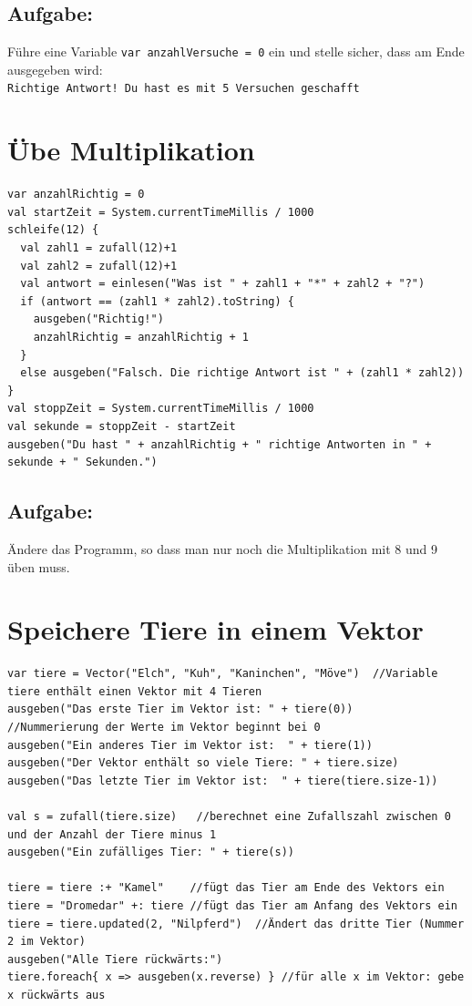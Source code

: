 \section*{\color{BrickRed}Aufgabe:}
Führe eine Variable \lstinline{var anzahlVersuche = 0} ein und stelle sicher, dass am Ende ausgegeben wird:\\
\lstinline{Richtige Antwort! Du hast es mit 5 Versuchen geschafft}
\chapter{Übe Multiplikation}
\begin{lstlisting}[basicstyle={\ttfamily\fontsize{16}{19}\selectfont},numbers=none]
var anzahlRichtig = 0
val startZeit = System.currentTimeMillis / 1000
schleife(12) {
  val zahl1 = zufall(12)+1
  val zahl2 = zufall(12)+1
  val antwort = einlesen("Was ist " + zahl1 + "*" + zahl2 + "?")
  if (antwort == (zahl1 * zahl2).toString) {
    ausgeben("Richtig!")
    anzahlRichtig = anzahlRichtig + 1
  }
  else ausgeben("Falsch. Die richtige Antwort ist " + (zahl1 * zahl2))
}
val stoppZeit = System.currentTimeMillis / 1000
val sekunde = stoppZeit - startZeit
ausgeben("Du hast " + anzahlRichtig + " richtige Antworten in " + sekunde + " Sekunden.")
\end{lstlisting}
        
\section*{\color{BrickRed}Aufgabe:}
Ändere das Programm, so dass man nur noch die Multiplikation mit 8 und 9 üben muss.
\chapter{Speichere Tiere in einem Vektor}
\begin{lstlisting}[basicstyle={\ttfamily\fontsize{14}{17}\selectfont},numbers=none]
var tiere = Vector("Elch", "Kuh", "Kaninchen", "Möve")  //Variable tiere enthält einen Vektor mit 4 Tieren
ausgeben("Das erste Tier im Vektor ist: " + tiere(0))     //Nummerierung der Werte im Vektor beginnt bei 0
ausgeben("Ein anderes Tier im Vektor ist:  " + tiere(1))
ausgeben("Der Vektor enthält so viele Tiere: " + tiere.size)
ausgeben("Das letzte Tier im Vektor ist:  " + tiere(tiere.size-1))

val s = zufall(tiere.size)   //berechnet eine Zufallszahl zwischen 0 und der Anzahl der Tiere minus 1
ausgeben("Ein zufälliges Tier: " + tiere(s))

tiere = tiere :+ "Kamel"    //fügt das Tier am Ende des Vektors ein
tiere = "Dromedar" +: tiere //fügt das Tier am Anfang des Vektors ein
tiere = tiere.updated(2, "Nilpferd")  //Ändert das dritte Tier (Nummer 2 im Vektor)
ausgeben("Alle Tiere rückwärts:")
tiere.foreach{ x => ausgeben(x.reverse) } //für alle x im Vektor: gebe x rückwärts aus
\end{lstlisting}
        
